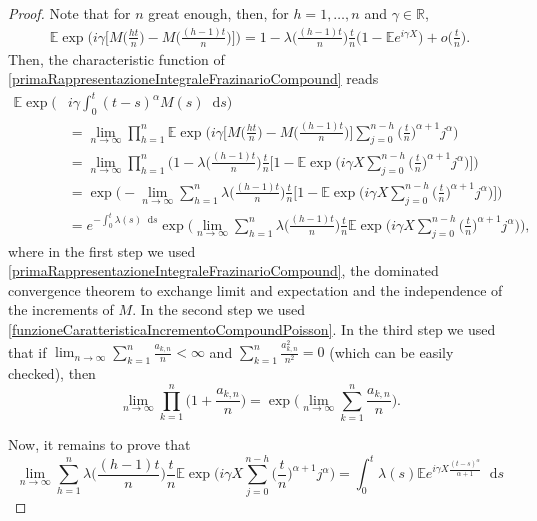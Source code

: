 \documentclass[10pt,a4paper]{amsart}
\newcommand*\dif{\mathop{}\!\mathrm{d}}  %
\begin{document}
\begin{proof}
Note that for $n$ great enough, then, for $ h=1,\dots,n$ and $\gamma \in\mathbb{R}$,
\begin{align}\label{funzioneCaratteristicaIncrementoCompoundPoisson}
	\mathbb{E} \exp\Bigg(i\gamma \bigg[ M\bigg(\frac{ht}{n}\bigg) - M\bigg(\frac{(h-1)t}{n}\bigg)\bigg] \Bigg) =1-\lambda\bigg(\frac{(h-1)t}{n}\bigg)\frac{t}{n}\Bigg(1-\mathbb{E}e^{i\gamma X}\Bigg)+o\bigg(\frac{t}{n}\bigg).
\end{align}
Then, the characteristic function of \eqref{primaRappresentazioneIntegraleFrazinarioCompound} reads
\begin{align}
	\mathbb{E}\exp\bigg(&i\gamma \int_0^t (t-s)^\alpha M(s)\dif s\bigg)\nonumber \\
	&= \lim_{n\rightarrow\infty}\prod_{h=1}^n\mathbb{E} \exp\Bigg(i\gamma \bigg[M\bigg(\frac{ht}{n}\bigg) - M\bigg(\frac{(h-1)t}{n}\bigg) \bigg] \sum_{j = 0}^{n-h} \bigg(\frac{t}{n}\bigg)^{\alpha+1} j^\alpha \Bigg)\nonumber\\
	& = \lim_{n\rightarrow\infty}\prod_{h=1}^n \Bigg( 1-\lambda\bigg(\frac{(h-1)t}{n}\bigg)\frac{t}{n}\bigg[1-\mathbb{E}\exp\bigg( i\gamma X \sum_{j = 0}^{n-h} \bigg(\frac{t}{n}\bigg)^{\alpha+1} j^\alpha \bigg)\bigg] \Bigg)\nonumber\\
	& = \exp\Bigg( -\lim_{n\rightarrow\infty} \sum_{h=1}^n\lambda\bigg(\frac{(h-1)t}{n}\bigg)\frac{t}{n}\bigg[1-\mathbb{E}\exp\bigg( i\gamma X \sum_{j = 0}^{n-h} \bigg(\frac{t}{n}\bigg)^{\alpha+1} j^\alpha \bigg)\bigg] \Bigg) \nonumber\\ %
	& = e^{-\int_0^t \lambda(s)\dif s} \exp\Bigg(\lim_{n\rightarrow\infty} \sum_{h=1}^n \lambda\bigg(\frac{(h-1)t}{n}\bigg)\frac{t}{n} \mathbb{E}\exp\bigg( i\gamma X \sum_{j = 0}^{n-h} \bigg(\frac{t}{n}\bigg)^{\alpha+1} j^\alpha \bigg) \Bigg) ,\nonumber
\end{align}
where in the first step we used \eqref{primaRappresentazioneIntegraleFrazinarioCompound}, the dominated convergence theorem to exchange limit and expectation and the independence of the increments of $M$.  In the second step we used \eqref{funzioneCaratteristicaIncrementoCompoundPoisson}. In the third step we used that if $\lim_{n\rightarrow\infty} \sum_{k=1}^n \frac{a_{k,n}}{n}<\infty$ and $\sum_{k=1}^n \frac{a^2_{k,n}}{n^2}=0$ (which can be easily checked), then
$$\lim_{n\rightarrow\infty} \prod_{k=1}^n\Big(1+\frac{a_{k,n}}{n}\Big) = \exp\Bigg( \lim_{n\rightarrow\infty}\sum_{k=1}^n \frac{a_{k,n}}{n}\Bigg).$$

Now, it remains to prove that
\begin{equation}
	\lim_{n\rightarrow\infty} \sum_{h=1}^n \lambda\bigg(\frac{(h-1)t}{n}\bigg)\frac{t}{n} \mathbb{E}\exp\bigg( i\gamma X \sum_{j = 0}^{n-h} \bigg(\frac{t}{n}\bigg)^{\alpha+1} j^\alpha \bigg) = \int_0^t \lambda(s) \mathbb{E} e^{i\gamma X \frac{(t-s)^\alpha}{ \alpha+1}  } \dif s
	\end{equation}


\end{proof}
\end{document}
